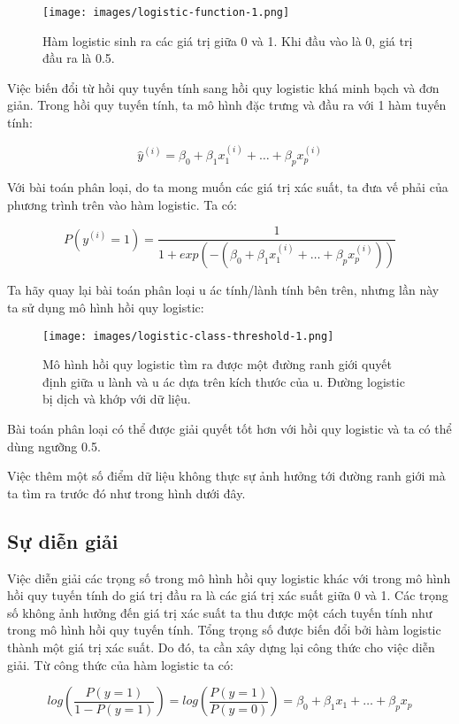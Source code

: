 \begin{figure*}[h!]
	\centering
	\texttt{[image: images/logistic-function-1.png]}
	\label{fig:4_2_2}
	\caption{Hàm logistic sinh ra các giá trị giữa 0 và 1. Khi đầu vào là 0, giá trị đầu ra là 0.5. }
\end{figure*}

Việc biến đổi từ hồi quy tuyến tính sang hồi quy logistic khá minh bạch và đơn giản. Trong hồi quy tuyến tính, ta mô hình đặc trưng và đầu ra với 1 hàm tuyến tính:

$$\hat{y}^{(i)}=\beta_{0}+\beta_{1}x^{(i)}_{1}+\ldots+\beta_{p}x^{(i)}_{p}$$

Với bài toán phân loại, do ta mong muốn các giá trị xác suất, ta đưa vế phải của phương trình trên vào hàm logistic. Ta có:

$$P(y^{(i)}=1)=\frac{1}{1+exp(-(\beta_{0}+\beta_{1}x^{(i)}_{1}+\ldots+\beta_{p}x^{(i)}_{p}))}$$

Ta hãy quay lại bài toán phân loại u ác tính/lành tính bên trên, nhưng lần này ta sử dụng mô hình hồi quy logistic:

\begin{figure*}[h!]
	\centering
	\texttt{[image: images/logistic-class-threshold-1.png]}
	\label{fig:4_222}
	\caption{Mô hình hồi quy logistic tìm ra được một đường ranh giới quyết định giữa u lành và u ác dựa trên kích thước của u. Đường logistic bị dịch và khớp với dữ liệu.}
\end{figure*}

Bài toán phân loại có thể được giải quyết tốt hơn với hồi quy logistic và ta có thể dùng ngưỡng 0.5. 

Việc thêm một số điểm dữ liệu không thực sự ảnh hưởng tới đường ranh giới mà ta tìm ra trước đó như trong hình dưới đây.

\subsection{Sự diễn giải}

Việc diễn giải các trọng số trong mô hình hồi quy logistic khác với trong mô hình hồi quy tuyến tính do giá trị đầu ra là các giá trị xác suất giữa 0 và 1. Các trọng số không ảnh hưởng đến giá trị xác suất ta thu được một cách tuyến tính như trong mô hình hồi quy tuyến tính. Tổng trọng số được biến đổi bởi hàm logistic thành một giá trị xác suất. Do đó, ta cần xây dựng lại công thức cho việc diễn giải. Từ công thức của hàm logistic ta có:

$$log\left(\frac{P(y=1)}{1-P(y=1)}\right)=log\left(\frac{P(y=1)}{P(y=0)}\right)=\beta_{0}+\beta_{1}x_{1}+\ldots+\beta_{p}x_{p}$$

